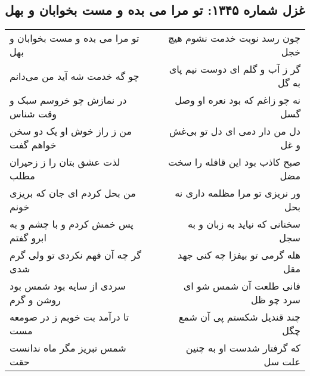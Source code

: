 \begin{center}
\section*{غزل شماره ۱۳۴۵: تو مرا می بده و مست بخوابان و بهل}
\label{sec:1345}
\begin{longtable}{l p{0.5cm} r}
تو مرا می بده و مست بخوابان و بهل
&&
چون رسد نوبت خدمت نشوم هیچ خجل
\\
چو گه خدمت شه آید من می‌دانم
&&
گر ز آب و گلم ای دوست نیم پای به گل
\\
در نمازش چو خروسم سبک و وقت شناس
&&
نه چو زاغم که بود نعره او وصل گسل
\\
من ز راز خوش او یک دو سخن خواهم گفت
&&
دل من دار دمی ای دل تو بی‌غش و غل
\\
لذت عشق بتان را ز زحیران مطلب
&&
صبح کاذب بود این قافله را سخت مضل
\\
من بحل کردم ای جان که بریزی خونم
&&
ور نریزی تو مرا مظلمه داری نه بحل
\\
پس خمش کردم و با چشم و به ابرو گفتم
&&
سخنانی که نیاید به زبان و به سجل
\\
گر چه آن فهم نکردی تو ولی گرم شدی
&&
هله گرمی تو بیفزا چه کنی جهد مقل
\\
سردی از سایه بود شمس بود روشن و گرم
&&
فانی طلعت آن شمس شو ای سرد چو ظل
\\
تا درآمد بت خوبم ز در صومعه مست
&&
چند قندیل شکستم پی آن شمع چگل
\\
شمس تبریز مگر ماه ندانست حقت
&&
که گرفتار شدست او به چنین علت سل
\\
\end{longtable}
\end{center}
